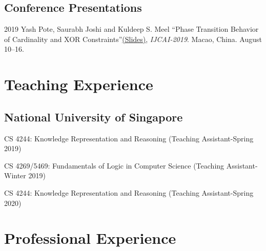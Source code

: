 \documentclass[12pt,letterpaper]{report}
\newcommand{\listitemspace}{0.15em}
\renewenvironment{itemize}
{\begin{list}{}{\setlength{\leftmargin}{0em}
            \setlength{\parskip}{0em}
            \setlength{\itemsep}{\listitemspace}
            \setlength{\parsep}{\listitemspace}}}
    {\end{list}}
\begin{document}
%
%


    \subsection*{Conference Presentations}


    \begin{tablist}
    	
    	\item[2019] \tab Yash Pote, Saurabh Joshi and Kuldeep S. Meel \enquote{Phase Transition Behavior of Cardinality and XOR Constraints}\href{https://meelgroup.github.io/files/slides/ijcai19pjm.pdf}{(Slides)}, \textit{IJCAI-2019}. Macao, China. August 10--16.
    	
    \end{tablist}

    \section*{Teaching Experience}

    \subsection*{National University of Singapore}
    
    \begin{itemize}
    	
    	\item CS 4244: Knowledge Representation and Reasoning (Teaching Assistant-Spring 2019)
    	\item CS 4269/5469: Fundamentals of Logic in Computer Science (Teaching Assistant-Winter 2019)
    	\item CS 4244: Knowledge Representation and Reasoning (Teaching Assistant-Spring 2020)
    
	\end{itemize}
    	
    \section*{Professional Experience}
\end{document}
